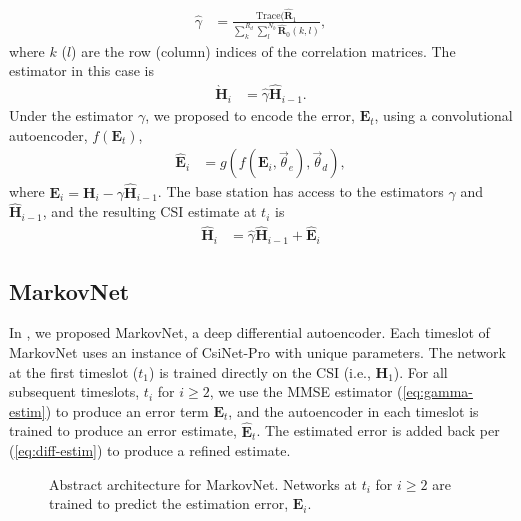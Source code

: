 \begin{align}
	\hat \gamma &= \frac{\text{Trace}(\hat{\mathbf R}_1}{\sum_k^{R_d}\sum_l^{N_b}\hat{\mathbf R}_0(k,l)}, \label{eq:gamma-hat}
\end{align}
where $k$ ($l$) are the row (column) indices of the correlation matrices. The estimator in this case is 
\begin{align}
	\grave{\mathbf H}_i &= \hat\gamma \hat{\mathbf H}_{i-1} \label{eq:gamma-estim}.
\end{align}
Under the estimator $\gamma$, we proposed to encode the error, $\mathbf E_t$, using a convolutional autoencoder, $f(\mathbf E_t)$,
\begin{align*}
	\hat{\mathbf E}_i &= g(f(\mathbf E_i, \vec\theta_e), \vec\theta_d),
\end{align*}
where $\mathbf E_i = \mathbf H_i - \gamma\hat{\mathbf H}_{i-1}$. The base station has access to the estimators $\gamma$ and $\hat{\mathbf H}_{i-1}$, and the resulting CSI estimate at $t_i$ is
\begin{align}
	\hat{\mathbf H}_i &= \hat\gamma \hat{\mathbf H}_{i-1} + \hat{\mathbf{E}}_i \label{eq:diff-estim}
\end{align}

\subsection{MarkovNet}

In \cite{ref:Liu2020MarkovNet}, we proposed MarkovNet, a deep differential autoencoder. Each timeslot of MarkovNet uses an instance of CsiNet-Pro with unique parameters. The network at the first timeslot ($t_1$) is trained directly on the CSI (i.e., $\mathbf H_1$). For all subsequent timeslots, $t_i$ for $i \geq 2$, we use the MMSE estimator (\ref{eq:gamma-estim}) to produce an error term $\mathbf E_t$, and the autoencoder in each timeslot is trained to produce an error estimate, $\hat{\mathbf E}_t$. The estimated error is added back per (\ref{eq:diff-estim}) to produce a refined estimate.

\begin{figure}[!hbtp]
    \centering
    {
      \fontsize{6pt}{8pt}
      \def\svgwidth{1.0\columnwidth}
      
    }
    \caption{Abstract architecture for MarkovNet. Networks at $t_i$ for $i \geq 2$ are trained to predict the estimation error, $\mathbf E_i$.}
    \label{fig:markovnet_schema}
\end{figure}

